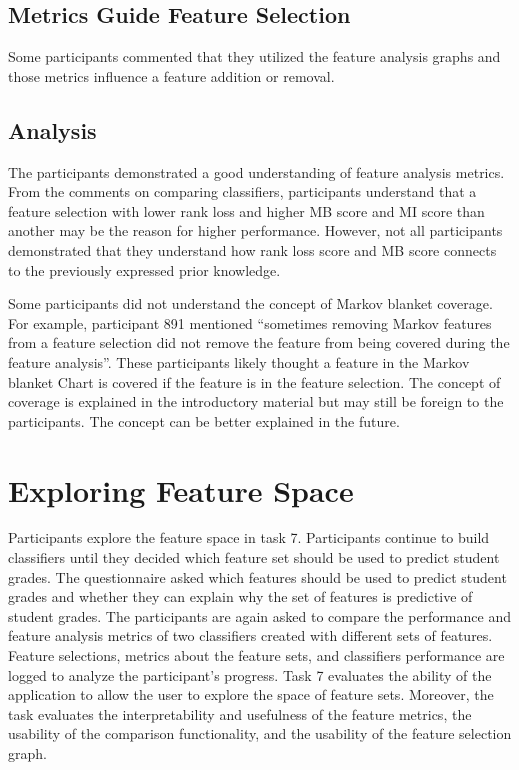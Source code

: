 \subsection { Metrics Guide Feature Selection }
Some participants commented that they utilized the feature analysis graphs and those metrics influence a feature addition or removal.


\subsection{ Analysis }
The participants demonstrated a good understanding of feature analysis metrics. From the comments on comparing classifiers, participants understand that a feature selection with lower rank loss and higher MB score and MI score than another may be the reason for higher performance. However, not all participants demonstrated that they understand how rank loss score and MB score connects to the previously expressed prior knowledge.

Some participants did not understand the concept of Markov blanket coverage. For example, participant 891 mentioned “sometimes removing Markov features from a feature selection did not remove the feature from being covered during the feature analysis”. These participants likely thought a feature in the Markov blanket Chart is covered if the feature is in the feature selection. The concept of coverage is explained in the introductory material but may still be foreign to the participants. The concept can be better explained in the future.


\section{ Exploring Feature Space }
Participants explore the feature space in task 7. Participants continue to build classifiers until they decided which feature set should be used to predict student grades. The questionnaire asked which features should be used to predict student grades and whether they can explain why the set of features is predictive of student grades. The participants are again asked to compare the performance and feature analysis metrics of two classifiers created with different sets of features. Feature selections, metrics about the feature sets, and classifiers performance are logged to analyze the participant's progress. Task 7 evaluates the ability of the application to allow the user to explore the space of feature sets. Moreover, the task evaluates the interpretability and usefulness of the feature metrics, the usability of the comparison functionality, and the usability of the feature selection graph.

